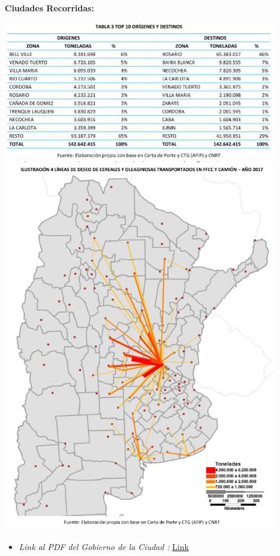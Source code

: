 \documentclass[
10pt, %
a4paper, %
oneside, %
headinclude,footinclude, %
BCOR5mm, %
]{scrartcl}
\begin{document}
 \textbf{Ciudades Recorridas:}
 \begin{flushleft}
     \includegraphics[width=12cm, keepaspectratio]{images/cities.png}
     \includegraphics[width=12cm, keepaspectratio]{images/country_map.png}
 \end{flushleft}
  \begin{itemize}
    \item \textit{Link al PDF del Gobierno de la Ciudad :}
      \href{https://www.argentina.gob.ar/sites/default/files/transporte_terrestre_de_cereales_y_oleaginosas_2017_v1.pdf} {Link}
  \end{itemize}
\end{document}
